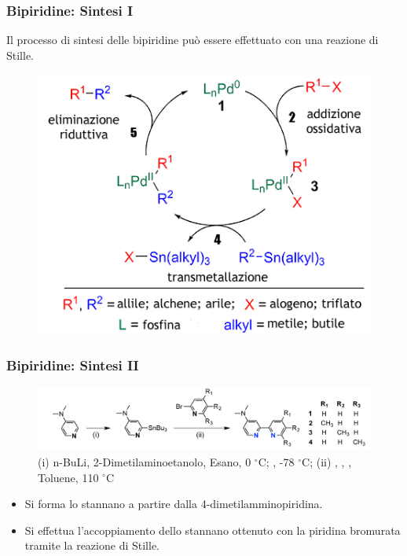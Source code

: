 \documentclass[9pt]{beamer}
\begin{document}
\begin{frame}
	\frametitle{Bipiridine: Sintesi I}
	Il processo di sintesi delle bipiridine può essere effettuato con una reazione di Stille.
	
	\begin{figure}
		\includegraphics[scale=0.7]{immagini/stille.png}
	\end{figure}
\end{frame}

\begin{frame}
	\frametitle{Bipiridine: Sintesi II}
	\begin{figure}
		\includegraphics[width=\textwidth]{immagini/rea_g.png}
		{\caption*{\footnotesize{(i) n-BuLi, 2-Dimetilaminoetanolo, Esano, 0 $^\circ$C; , -78 $^\circ$C; (ii) , , , Toluene, 110 $^\circ$C}}}
	\end{figure}
	\begin{itemize}
		\item Si forma lo stannano a partire dalla 4-dimetilamminopiridina.
		\item Si effettua l'accoppiamento dello stannano ottenuto con la piridina bromurata tramite la reazione di Stille.
	\end{itemize}
	
	
\end{frame}
\end{document}
